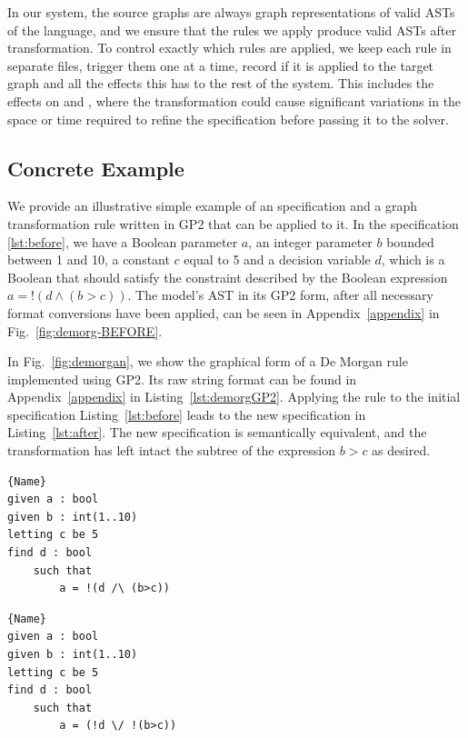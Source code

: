 \documentclass[runningheads]{llncs}
\begin{document}
In our system, the source graphs are always graph representations of valid ASTs of the \essence language, and we ensure that the rules we apply produce valid \essence ASTs after transformation. To control exactly which rules are applied, we keep each rule in separate files, trigger them one at a time, record if it is applied to the target graph and all the effects this has to the rest of the system. This includes the effects on \conjure and \savilerow, where the transformation could cause significant variations in the space or time required to refine the specification before passing it to the solver.


\subsection{Concrete Example}

We provide an illustrative simple example of an \essence specification and a graph transformation rule written in GP2 that can be applied to it. In the specification \ref{lst:before}, we have a Boolean parameter $a$, an integer parameter $b$ bounded between 1 and 10, a constant $c$ equal to 5 and a decision variable $d$, which is a Boolean that should satisfy the constraint described by the Boolean expression $a=!(d \land (b>c))$. The model's AST in its GP2 form, after all necessary format conversions have been applied, can be seen in Appendix~\ref{appendix} in Fig.~\ref{fig:demorg-BEFORE}. 

In Fig.~\ref{fig:demorgan}, we show the graphical form of a De Morgan rule implemented using GP2. Its raw string format can be found in Appendix~\ref{appendix} in Listing~\ref{lst:demorgGP2}. Applying the rule to the initial specification Listing~\ref{lst:before} leads to the new specification in Listing~\ref{lst:after}. The new specification is semantically equivalent, and the transformation has left intact the subtree of the expression $b>c$ as desired.

\noindent\begin{minipage}{.45\textwidth}
\begin{lstlisting}[caption=Original Specification,label={lst:before},frame=tlrb]{Name}
given a : bool
given b : int(1..10)
letting c be 5
find d : bool
    such that
        a = !(d /\ (b>c))
\end{lstlisting}
\end{minipage}\hfill
\begin{minipage}{.45\textwidth}
\begin{lstlisting}[caption=Rewritten Specification,label={lst:after},frame=tlrb]{Name}
given a : bool
given b : int(1..10)
letting c be 5
find d : bool
    such that
        a = (!d \/ !(b>c))
\end{lstlisting}
\end{minipage}
\end{document}
